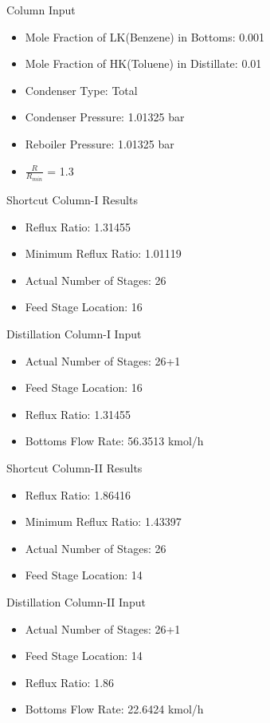 \documentclass[10pt]{beamer}
\begin{document}
\begin{frame}{Column Input}
	\begin{itemize}
		\item Mole Fraction of LK(Benzene) in Bottoms: 0.001
		\item Mole Fraction of HK(Toluene) in Distillate: 0.01
		\item Condenser Type: Total
		\item Condenser Pressure: 1.01325 bar
		\item Reboiler Pressure: 1.01325 bar
		\item $\frac{R}{R_{min}}$ = 1.3
	\end{itemize}
\end{frame}

\begin{frame}{Shortcut Column-I Results}
	\begin{itemize}
		\item Reflux Ratio: 1.31455
		\item Minimum Reflux Ratio: 1.01119
		\item Actual Number of Stages: 26
		\item Feed Stage Location: 16
	\end{itemize}
\end{frame}


\begin{frame}{Distillation Column-I Input}
	\begin{itemize}
		\item Actual Number of Stages: 26+1
		\item Feed Stage Location: 16
		\item Reflux Ratio: 1.31455
		\item Bottoms Flow Rate: 56.3513 kmol/h
	\end{itemize}
\end{frame}


\begin{frame}{Shortcut Column-II Results}
	\begin{itemize}
		\item Reflux Ratio: 1.86416
		\item Minimum Reflux Ratio: 1.43397
		\item Actual Number of Stages: 26
		\item Feed Stage Location: 14
	\end{itemize}
\end{frame}


\begin{frame}{Distillation Column-II Input}
	\begin{itemize}
		\item Actual Number of Stages: 26+1
		\item Feed Stage Location: 14
		\item Reflux Ratio: 1.86
		\item Bottoms Flow Rate: 22.6424 kmol/h
	\end{itemize}
\end{frame}
\end{document}
